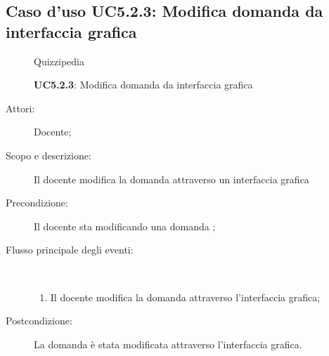 \subsection{Caso d'uso UC5.2.3: Modifica domanda da interfaccia grafica}
	\begin{figure}[H]
		\centering
		\begin{resizedtikzpicture}{\textwidth}
		\begin{umlsystem}[x=0, fill=lightgray!20]{Quizzipedia}
		\end{umlsystem}
		\end{resizedtikzpicture}
		\caption{\textbf{UC5.2.3}: Modifica domanda da interfaccia grafica}
		\label{UC5.2.3}
	\end{figure}
\begin{description}
\item[Attori:] Docente;
\item[Scopo e descrizione:] Il docente modifica la domanda attraverso un interfaccia grafica

      \item[Precondizione:] Il docente sta modificando una domanda
;

        \item[Flusso principale degli eventi:] \ 
 \begin{enumerate}
          \item Il docente modifica la domanda attraverso l'interfaccia grafica;

      \end{enumerate}
    \item[Postcondizione:] La domanda è stata modificata attraverso l'interfaccia grafica.
  \end{description}
\hypertarget{UC5.3}{}
